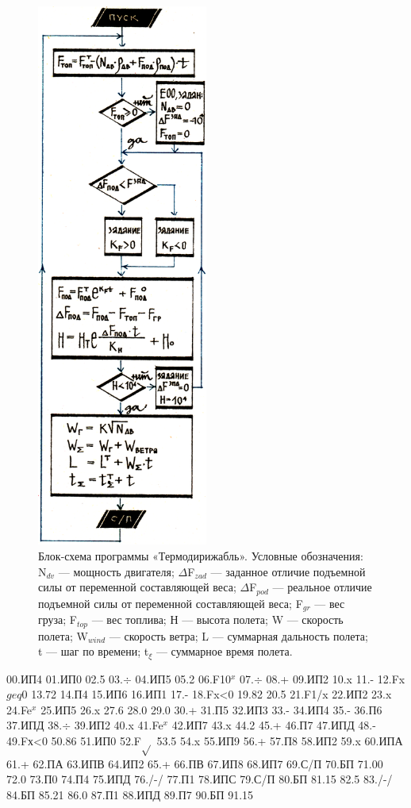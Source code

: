 \documentclass[11pt,a4paper,oneside]{article}
\begin{document}
\begin{figure}[H]
\includegraphics[width=0.5\textwidth]{zeppelin2}
\caption{Блок-схема программы «Термодирижабль». Условные обозначения: N$_{dv}$ — мощность двигателя; $\Delta$F$_{zad}$ —  заданное отличие подъемной силы от переменной составляющей веса; $\Delta$F$_{pod}$ — реальное отличие подъемной силы от переменной составляющей веса; F$_{gr}$ — вес груза; F$_{top}$ — вес топлива; Н — высота полета; W — скорость полета; W$_{wind}$ — скорость ветра; L — суммарная дальность полета; t — шаг по времени; t$_{\xi}$ — суммарное время полета.}
\end{figure}
00.ИП4 01.ИП0 02.5 03.$\div$ 04.ИП5 05.2 06.F10$^{x}$ 07.$\div$ 08.+ 09.ИП2 10.x 11.- 12.Fx$geq$0 13.72 14.П4 15.ИП6 16.ИП1 17.- 18.Fx<0 19.82 20.5 21.F1/x 22.ИП2 23.x 24.Fe$^{x}$ 25.ИП5 26.x 27.6 28.0 29.0 30.+ 31.П5 32.ИП3 33.- 34.ИП4 35.- 36.П6 37.ИПД 38.$\div$ 39.ИП2 40.x 41.Fe$^{x}$ 42.ИП7 43.x 44.2 45.+ 46.П7 47.ИПД 48.- 49.Fх<0 50.86 51.ИП0 52.F$\sqrt{}$ 53.5 54.x 55.ИП9 56.+ 57.П8 58.ИП2 59.x 60.ИПА 61.+ 62.ПА 63.ИПВ 64.ИП2 65.+ 66.ПВ 67.ИП8 68.ИП7 69.С/П 70.БП 71.00 72.0 73.П0 74.П4 75.ИПД 76./-/ 77.П1 78.ИПС 79.С/П 80.БП 81.15 82.5 83./-/ 84.БП 85.21 86.0 87.П1 88.ИПД 89.П7 90.БП
91.15
\end{document}
